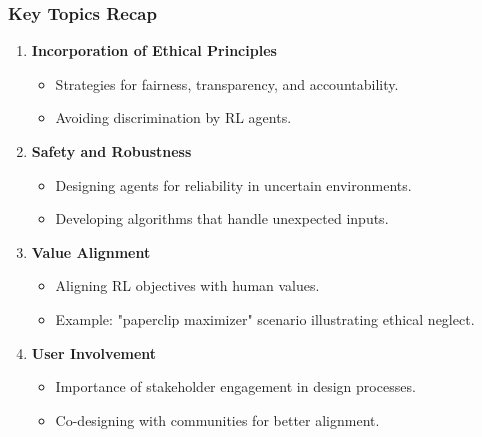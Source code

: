\documentclass{beamer}
\begin{document}
\begin{frame}[fragile]
    \frametitle{Key Topics Recap}
    \begin{enumerate}
        \item \textbf{Incorporation of Ethical Principles}
            \begin{itemize}
                \item Strategies for fairness, transparency, and accountability.
                \item Avoiding discrimination by RL agents.
            \end{itemize}

        \item \textbf{Safety and Robustness}
            \begin{itemize}
                \item Designing agents for reliability in uncertain environments.
                \item Developing algorithms that handle unexpected inputs.
            \end{itemize}

        \item \textbf{Value Alignment}
            \begin{itemize}
                \item Aligning RL objectives with human values.
                \item Example: "paperclip maximizer" scenario illustrating ethical neglect.
            \end{itemize}

        \item \textbf{User Involvement}
            \begin{itemize}
                \item Importance of stakeholder engagement in design processes.
                \item Co-designing with communities for better alignment.
            \end{itemize}
    \end{enumerate}
\end{frame}
\end{document}
